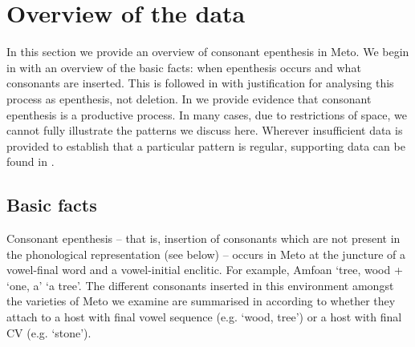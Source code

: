 \documentclass[output=paper]{langscibook}
\begin{document}
\section{Overview of the data}\label{sec:Data}
\largerpage
In this section we provide an overview of consonant epenthesis in Meto.
We begin in  with an overview of the basic facts:
when epenthesis occurs and what consonants are inserted.
This is followed in  with justification
for analysing this process as epenthesis, not deletion.
In  we provide evidence that consonant epenthesis
is a productive process.
In many cases, due to restrictions of space, we cannot fully illustrate
the patterns we discuss here. Wherever insufficient data is provided
to establish that a particular pattern is regular, supporting data
can be found in .

\subsection{Basic facts}\label{sec:BasFac}
Consonant epenthesis --
that is, insertion of consonants which are not present in the phonological
representation (see  below) -- 
occurs in Meto at the juncture
of a vowel-final word and a vowel-initial enclitic. For example,
Amfo{\Q}an  `tree, wood +  `one, a'
{\ra}  `a tree'.
The different consonants inserted in this environment
amongst the varieties of Meto we examine
are summarised in 
according to whether they attach to a host
with final vowel sequence (e.g.  `wood, tree')
or a host with final CV (e.g.  `stone').
\end{document}
